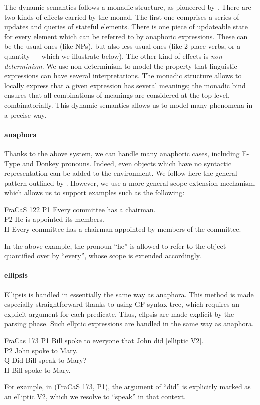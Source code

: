 \documentclass[11pt]{article}
\begin{document}
The dynamic semantics follows a monadic structure, as pioneered by
\citet{Shan:2002}. There are two kinds of effects carried by the
monad.  The first one comprises a series of updates and queries of
stateful elements.  There is one piece of updateable state for every
element which can be referred to by anaphoric expressions. These can
be the usual ones (like NPs), but also less usual ones (like 2-place
verbs, or a quantity --- which we illustrate below). The other kind of
effects is \emph{non-determinism}. We use non-determinism to model the
property that linguistic expressions can have several
interpretations. The monadic structure allows to locally express that
a given expression has several meanings; the monadic bind ensures that
all combinations of meanings are considered at the top-level,
combinatorially. This dynamic semantics allows us to model many
phenomena in a precise way.

\paragraph{anaphora} Thanks to the above system, we can handle many
anaphoric cases, including E-Type and Donkey pronouns. Indeed, even
objects which have no syntactic representation can be added to the
environment. We follow here the general pattern outlined by
\citet{unger:2011}. However, we use a more general scope-extension
mechanism, which allows us to support examples such as the following:
\begin{lingex}
\item[FraCaS 122]
P1	Every committee has a chairman.\\
P2	He is appointed its members.\\
H 	Every committee has a chairman appointed by members of the committee. 
\end{lingex}
In the above example, the pronoun ``he'' is allowed to refer to the
object quantified over by ``every'', whose scope is extended
accordingly.

\paragraph{ellipsis} Ellipsis is handled in essentially the same way
as anaphora. This method is made especially straightforward thanks to
using GF syntax tree, which requires an explicit argument for each
predicate. Thus, ellpsis are made explicit by the parsing phase. Such
ellptic expressions are handled in the same way as anaphora.
\begin{lingex}
\item[FraCas 173]
  P1	Bill spoke to everyone that John did [elliptic V2].\\
  P2	John spoke to Mary.\\
  Q 	Did Bill speak to Mary?\\
  H 	Bill spoke to Mary.
\end{lingex}
For example, in (FraCaS 173, P1), the argument of ``did'' is
explicitly marked as an elliptic V2, which we resolve to ``speak'' in
that context.
\end{document}
